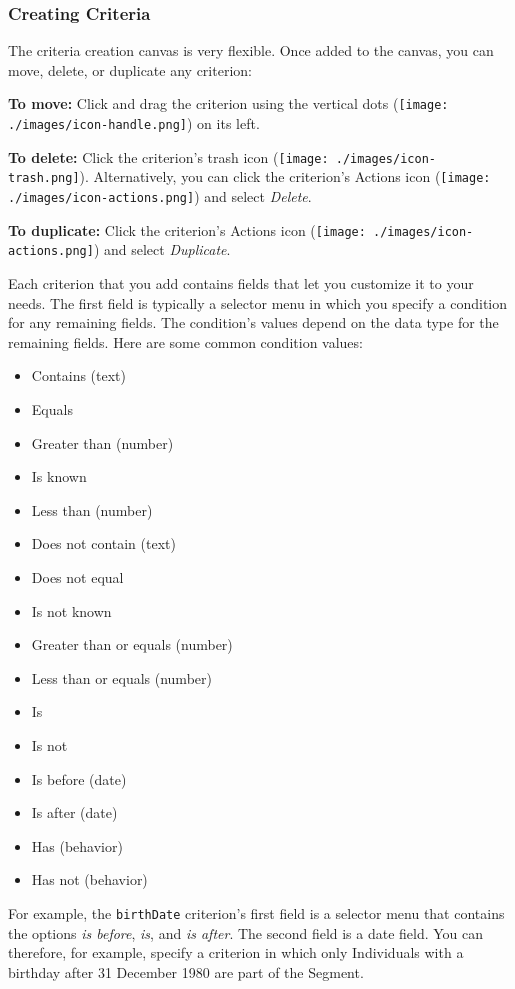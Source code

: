 \subsubsection{Creating Criteria}\label{creating-criteria}

The criteria creation canvas is very flexible. Once added to the canvas,
you can move, delete, or duplicate any criterion:

\textbf{To move:} Click and drag the criterion using the vertical dots
(\texttt{[image: ./images/icon-handle.png]}) on its left.

\textbf{To delete:} Click the criterion's trash icon
(\texttt{[image: ./images/icon-trash.png]}). Alternatively, you can
click the criterion's Actions icon
(\texttt{[image: ./images/icon-actions.png]}) and select \emph{Delete}.

\textbf{To duplicate:} Click the criterion's Actions icon
(\texttt{[image: ./images/icon-actions.png]}) and select
\emph{Duplicate}.

Each criterion that you add contains fields that let you customize it to
your needs. The first field is typically a selector menu in which you
specify a condition for any remaining fields. The condition's values
depend on the data type for the remaining fields. Here are some common
condition values:

\begin{itemize}
\tightlist
\item
  Contains (text)
\item
  Equals
\item
  Greater than (number)
\item
  Is known
\item
  Less than (number)
\item
  Does not contain (text)
\item
  Does not equal
\item
  Is not known
\item
  Greater than or equals (number)
\item
  Less than or equals (number)
\item
  Is
\item
  Is not
\item
  Is before (date)
\item
  Is after (date)
\item
  Has (behavior)
\item
  Has not (behavior)
\end{itemize}

For example, the \texttt{birthDate} criterion's first field is a
selector menu that contains the options \emph{is before}, \emph{is}, and
\emph{is after}. The second field is a date field. You can therefore,
for example, specify a criterion in which only Individuals with a
birthday after 31 December 1980 are part of the Segment.

